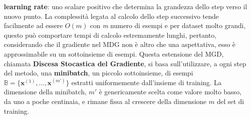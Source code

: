 \documentclass[12pt,a4paper]{report}
\begin{document}
    \textbf{learning rate}: uno scalare positivo che determina la 
    grandezza dello step verso il nuovo punto. La complessit\`a legata
    al calcolo dello step successivo tende facilmente ad essere $O(m)$
    con \textit{m} numero di esempi e per dataset molto grandi, questo 
    pu\`o comportare tempi di calcolo estremamente lunghi, pertanto,
    considerando che il gradiente nel MDG non \`e altro che una 
    aspettativa, esso \`e approssimabile su un sottoinsieme di esempi.
    Questa estensione del MGD, chiamata \textbf{Discesa Stocastica del 
    Gradiente}, si basa sull'utilizzare, a ogni step del metodo, una
    \textbf{minibatch}, un piccolo sottoinsieme, di esempi $\mathbb{B}=
    \{\textbf{x}^{(1)}, \dots, \textbf{x}^{(m')}\}$ estratti uniformemente
    dall'insieme di training. La dimensione della minibatch, $m'$
    \`e genericamente scelta come valore molto basso, da uno a poche 
    centinaia, e rimane fissa al crescere della dimensione $m$ 
    del set di training.
    
\end{document}
